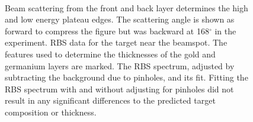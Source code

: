 \begin{figure}[!htbp]
\centering
{}
\\
\caption[Interpreting RBS data and constraining the target thickness.]{ Beam scattering from the front and back layer determines the high and low energy plateau edges.  The scattering angle is shown as forward to compress the figure but was backward at 168$^\circ$ in the experiment.   RBS data for the  target near the beamspot.  The features used to determine the thicknesses of the gold and germanium layers are marked.   The RBS spectrum, adjusted by subtracting the background due to pinholes, and its fit.  Fitting the RBS spectrum with and without adjusting for pinholes did not result in any significant differences to the predicted target composition or thickness.}
\end{figure}

